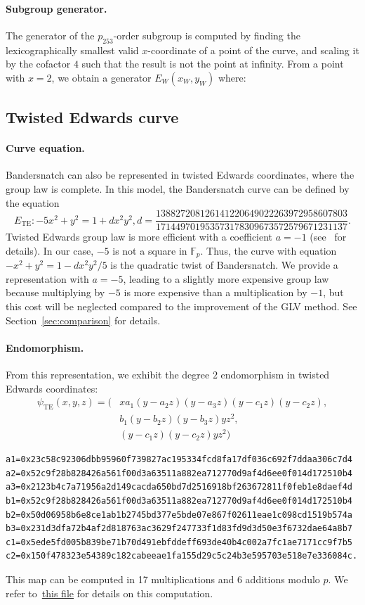 \documentclass{article}
\newcommand{\Fp}{\ensuremath{\mathbb F_p}}
\theoremstyle{definition}
\begin{document}
\paragraph{Subgroup generator.}
The generator of the $p_{253}$-order subgroup is computed by finding the
lexicographically smallest valid $x$-coordinate of a point of the
curve, and scaling it by the cofactor $4$ such that the result is not
the point at infinity. From a point with $x=2$, we obtain a generator $E_W(x_W,y_W)$ where:


\subsection{Twisted Edwards curve}
\paragraph{Curve equation.}
Bandersnatch can also be represented in twisted Edwards coordinates,
where the group law is complete.
In this model, the Bandersnatch curve can be defined by the equation
$$E_\text{TE}:-5x^2+y^2 = 1 +
dx^2y^2, d=\frac{138827208126141220649022263972958607803}{171449701953573178309673572579671231137}.$$
Twisted Edwards group law is more efficient with a coefficient
$a = -1$ (see~\cite{AC:HWCD08} for details).
In our case, $-5$ is not a square in $\Fp$. Thus, the curve with
equation $-x^2+y^2 = 1 -dx^2y^2/5$ is the quadratic twist of
Bandersnatch. We provide a representation with $a=-5$, leading to a
slightly more expensive group law because multiplying by $-5$ is more
expensive than a multiplication by $-1$, but this cost will be
neglected compared to the improvement of the GLV method. See
Section~\ref{sec:comparison} for details.

\paragraph{Endomorphism.}
From this representation, we exhibit the degree $2$ endomorphism in
twisted Edwards coordinates:
\begin{align*}
  \psi_\text{TE}(x,y,z) = (& xa_1(y-a_2z)(y-a_3z)(y-c_1z)(y-c_2z),\\
  & b_1(y-b_2z)(y-b_3z)yz^2,\\
  & (y-c_1z)(y-c_2z)yz^2)
\end{align*}

\begin{verbatim}
a1=0x23c58c92306dbb95960f739827ac195334fcd8fa17df036c692f7ddaa306c7d4
a2=0x52c9f28b828426a561f00d3a63511a882ea712770d9af4d6ee0f014d172510b4
a3=0x2123b4c7a71956a2d149cacda650bd7d2516918bf263672811f0feb1e8daef4d
b1=0x52c9f28b828426a561f00d3a63511a882ea712770d9af4d6ee0f014d172510b4
b2=0x50d06958b6e8ce1ab1b2745bd377e5bde07e867f02611eae1c098cd1519b574a
b3=0x231d3dfa72b4af2d818763ac3629f247733f1d83fd9d3d50e3f6732dae64a8b7
c1=0x5ede5fd005b839be71b70d491ebfddeff693de40b4c002a7fc1ae7171cc9f7b5
c2=0x150f478323e54389c182cabeeae1fa155d29c5c24b3e595703e518e7e336084c.
\end{verbatim}
This map can be computed in 17 multiplications and 6 additions modulo
$p$. We refer
to~\href{https://github.com/asanso/Bandersnatch/blob/main/python-ref-impl/bandersnatch.py}{this
  file} for details on this computation.
\end{document}
